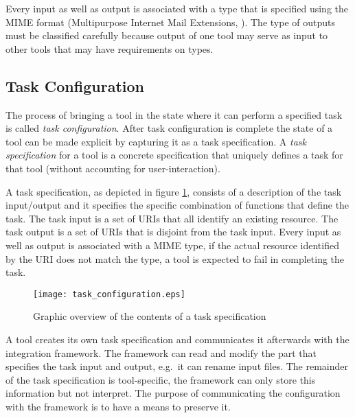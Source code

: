 \documentclass{article}
\begin{document}
   Every input as well as output is associated with a type that is specified
   using the MIME format (Multipurpose Internet Mail Extensions, \cite{rfc2822}).
   The type of outputs must be classified carefully because output of one tool
   may serve as input to other tools that may have requirements on types.

  \subsection{Task Configuration} \label{concepts::task_configuration}

   
   The process of bringing a tool in the state where it can perform a specified
   task is called \textit{task configuration}. After task configuration is
   complete the state of a tool can be made explicit by capturing it as a task
   specification.  A \textit{task specification} for a tool is a concrete
   specification that uniquely defines a task for that tool (without accounting
   for user-interaction).

   A task specification, as depicted in figure \ref{figure:task_specification},
   consists of a description of the task input/output and it specifies the
   specific combination of functions that define the task. The task input is a
   set of URIs that all identify an existing resource. The task output is a set
   of URIs that is disjoint from the task input. Every input as well as output
   is associated with a MIME type, if the actual resource identified by the URI
   does not match the type, a tool is expected to fail in completing the task.

   \begin{figure}[H]
    \begin{center}
     \texttt{[image: task\_configuration.eps]}
    \end{center}
    \caption{Graphic overview of the contents of a task specification}
    \label{figure:task_specification}
   \end{figure}

 
   A tool creates its own task specification and communicates it afterwards
   with the integration framework. The framework can read and modify the part
   that specifies the task input and output, e.g.\ it can rename input files.
   The remainder of the task specification is tool-specific, the framework can
   only store this information but not interpret. The purpose of communicating
   the configuration with the framework is to have a means to preserve it.
   
\end{document}
